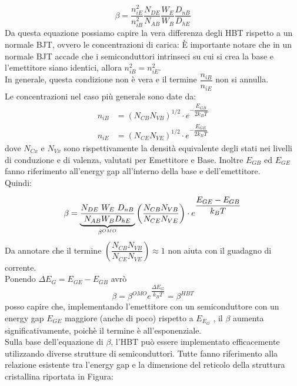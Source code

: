 \begin{equation}
    \beta = \dfrac{n_{iE}^2}{n_{iB}^2} \dfrac{N_{DE}}{N_{AB}} \dfrac{W_E}{W_B} \dfrac{D_{nB}}{D_{hE}}
\end{equation}
Da questa equazione possiamo capire la vera differenza degli HBT rispetto a un normale BJT, ovvero le concentrazioni di carica:
È importante notare che in un normale BJT accade che i semiconduttori intrinseci su cui si crea la base e l'emettitore siano identici, allora $n_{iB}^2 = n_{iE}^2$. \\
In generale, questa condizione non è vera e il termine $\dfrac{n_{iB}}{n_{iE}}$ non si annulla. \\

Le concentrazioni nel caso più generale sono date da:
\begin{align}
    n_{iB} &= (N_{CB}N_{VB})^{1/2} \cdot e^{-\dfrac{E_{GB}}{2k_BT}} \\
    n_{iE} &= (N_{CE}N_{VE})^{1/2} \cdot e^{-\dfrac{E_{GE}}{2k_BT}}
\end{align}
dove $N_{Cx}$ e $N_{Vx}$ sono rispettivamente la densità equivalente degli stati nei livelli di conduzione e di valenza, valutati per Emettitore e Base.
Inoltre $E_{GB}$ ed $E_{GE}$ fanno riferimento all'energy gap all'interno della base e dell'emettitore.\\
Quindi:

\begin{equation} %
   \beta = \underbrace{\frac{N_{DE}\ W_E\ D_{nB}}{N_{AB} W_B D_{hE}}}_{\LARGE{\beta^{OMO}}} \left( \dfrac{N_{CB}N_{VB}}{N_{CE}N_{VE}} \right) \cdot e^{\dfrac{E_{GE}-E_{GB}}{k_BT}}
\end{equation}
Da annotare che il termine $\left( \dfrac{N_{CB}N_{VB}}{N_{CE}N_{VE}} \right) \approx 1$ non aiuta con il guadagno di corrente. \\
Ponendo $\Delta E_G =E_{GE}-E_{GB}$ avrò
\begin{equation}
    \beta = \beta^{OMO} e^{\dfrac{\Delta E_G}{k_BT}}= \beta^{HBT}
\end{equation}
posso capire che, implementando l'emettitore con un semiconduttore con un energy gap $E_{GE}$ maggiore (anche di poco) rispetto a $E_{E_G}$ , il $\beta$ aumenta significativamente, poichè il termine è all'esponenziale.\\

Sulla base dell'equazione di $\beta$, l'HBT può essere implementato efficacemente utilizzando diverse strutture di semiconduttori. Tutte fanno riferimento alla relazione esistente tra l'energy gap e la dimensione del reticolo della struttura cristallina riportata in Figura:

